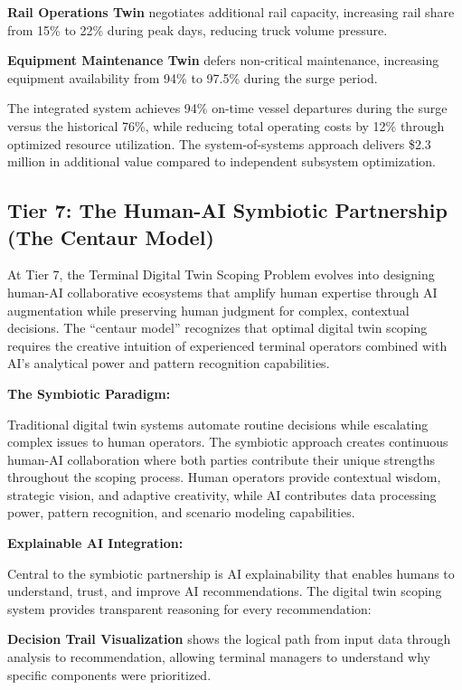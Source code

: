\documentclass{article}
\begin{document}
\textbf{Rail Operations Twin} negotiates additional rail capacity, increasing rail share from 15\% to 22\% during peak days, reducing truck volume pressure.

\textbf{Equipment Maintenance Twin} defers non-critical maintenance, increasing equipment availability from 94\% to 97.5\% during the surge period.

The integrated system achieves 94\% on-time vessel departures during the surge versus the historical 76\%, while reducing total operating costs by 12\% through optimized resource utilization. The system-of-systems approach delivers \$2.3 million in additional value compared to independent subsystem optimization.

\subsection{Tier 7: The Human-AI Symbiotic Partnership (The Centaur Model)}

At Tier 7, the Terminal Digital Twin Scoping Problem evolves into designing human-AI collaborative ecosystems that amplify human expertise through AI augmentation while preserving human judgment for complex, contextual decisions. The ``centaur model'' recognizes that optimal digital twin scoping requires the creative intuition of experienced terminal operators combined with AI's analytical power and pattern recognition capabilities.

\textbf{The Symbiotic Paradigm:}

Traditional digital twin systems automate routine decisions while escalating complex issues to human operators. The symbiotic approach creates continuous human-AI collaboration where both parties contribute their unique strengths throughout the scoping process. Human operators provide contextual wisdom, strategic vision, and adaptive creativity, while AI contributes data processing power, pattern recognition, and scenario modeling capabilities.

\textbf{Explainable AI Integration:}

Central to the symbiotic partnership is AI explainability that enables humans to understand, trust, and improve AI recommendations. The digital twin scoping system provides transparent reasoning for every recommendation:

\textbf{Decision Trail Visualization} shows the logical path from input data through analysis to recommendation, allowing terminal managers to understand why specific components were prioritized.
\end{document}
